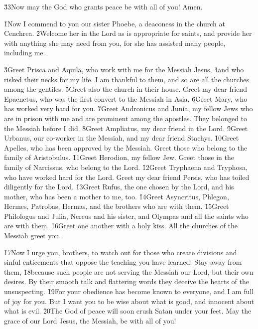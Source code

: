 \v{33}Now may the God who grants peace be with all of you! Amen.

\v{1}Now I commend to you our sister Phoebe, a deaconess in the church at Cenchrea. \v{2}Welcome her in the Lord as is appropriate for saints, and provide her with anything she may need from you, for she has assisted many people, including me.

\v{3}Greet Prisca and Aquila, who work with me for the Messiah Jesus, \v{4}and who risked their necks for my life. I am thankful to them, and so are all the churches among the gentiles. \v{5}Greet also the church in their house. Greet my dear friend Epaenetus, who was the first convert to the Messiah in Asia. \v{6}Greet Mary, who has worked very hard for you. \v{7}Greet Andronicus and Junia, my fellow Jews who are in prison with me and are prominent among the apostles. They belonged to the Messiah before I did. \v{8}Greet Ampliatus, my dear friend in the Lord. \v{9}Greet Urbanus, our co-worker in the Messiah, and my dear friend Stachys. \v{10}Greet Apelles, who has been approved by the Messiah. Greet those who belong to the family of Aristobulus. \v{11}Greet Herodion, my fellow Jew. Greet those in the family of Narcissus, who belong to the Lord. \v{12}Greet Tryphaena and Tryphosa, who have worked hard for the Lord. Greet my dear friend Persis, who has toiled diligently for the Lord. \v{13}Greet Rufus, the one chosen by the Lord, and his mother, who has been a mother to me, too. \v{14}Greet Asyncritus, Phlegon, Hermes, Patrobas, Hermas, and the brothers who are with them. \v{15}Greet Philologus and Julia, Nereus and his sister, and Olympas and all the saints who are with them. \v{16}Greet one another with a holy kiss. All the churches of the Messiah greet you.

\v{17}Now I urge you, brothers, to watch out for those who create divisions and sinful enticements that oppose the teaching you have learned. Stay away from them, \v{18}because such people are not serving the Messiah our Lord, but their own desires. By their smooth talk and flattering words they deceive the hearts of the unsuspecting. \v{19}For your obedience has become known to everyone, and I am full of joy for you. But I want you to be wise about what is good, and innocent about what is evil. \v{20}The God of peace will soon crush Satan under your feet. May the grace of our Lord Jesus, the Messiah, be with all of you!

